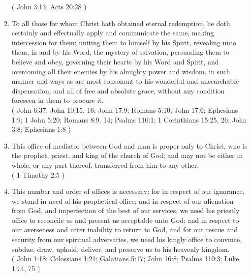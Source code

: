 \documentclass[12pt,a4paper]{book}
\begin{document}
\begin{enumerate}
( John 3:13; Acts 20:28 )
\item To all those for whom Christ hath obtained eternal redemption, he doth certainly and effectually apply and communicate the same, making intercession for them; uniting them to himself by his Spirit, revealing unto them, in and by his Word, the mystery of salvation, persuading them to believe and obey, governing their hearts by his Word and Spirit, and overcoming all their enemies by his almighty power and wisdom, in such manner and ways as are most consonant to his wonderful and unsearchable dispensation; and all of free and absolute grace, without any condition foreseen in them to procure it.\\
( John 6:37; John 10:15, 16; John 17:9; Romans 5:10; John 17:6; Ephesians 1:9; 1 John 5:20; Romans 8:9, 14; Psalms 110:1; 1 Corinthians 15:25, 26; John 3:8; Ephesians 1:8 )
\item This office of mediator between God and man is proper only to Christ, who is the prophet, priest, and king of the church of God; and may not be either in whole, or any part thereof, transferred from him to any other.\\
( 1 Timothy 2:5 )
\item This number and order of offices is necessary; for in respect of our ignorance, we stand in need of his prophetical office; and in respect of our alienation from God, and imperfection of the best of our services, we need his priestly office to reconcile us and present us acceptable unto God; and in respect to our averseness and utter inability to return to God, and for our rescue and security from our spiritual adversaries, we need his kingly office to convince, subdue, draw, uphold, deliver, and preserve us to his heavenly kingdom.\\
( John 1:18; Colossians 1:21; Galatians 5:17; John 16:8; Psalms 110:3; Luke 1:74, 75 )
\end{enumerate}
\end{document}
